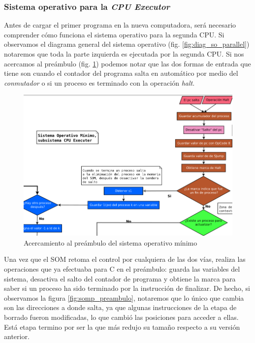 \documentclass[letterpaper,12pt,oneside]{book}
\begin{document}
			
			
			\subsubsection{Sistema operativo para la \textit{CPU Executor}}
			
				Antes de cargar el primer programa en la nueva computadora, será necesario comprender cómo funciona el sistema operativo para la
				segunda CPU. Si observamos el diagrama general 
				del sistema operativo (fig. \ref{fig:diag_so_parallel}) notaremos que toda la parte izquierda
				es ejecutada por la segunda CPU. Si nos acercamos al preámbulo (fig. \ref{fig:diag_so_paralel_cpue}) podemos notar que las
				dos formas de entrada que tiene son cuando el contador del programa salta en automático por medio del \textit{conmutador} o si
				un proceso es terminado con la operación \textit{halt}. 

			
			
			\begin{figure}[h]		
				\centering
				\includegraphics[scale=0.5]{media/Paralela/diag_so_paralel_cpue.png}
				\caption{ Acercamiento al preámbulo del sistema operativo mínimo}
				\label{fig:diag_so_paralel_cpue}
			\end{figure}	
			

				Una vez que el SOM retoma el control por cualquiera de las dos vías, realiza las operaciones que ya efectuaba para C en el preámbulo: 
				guarda las variables del sistema, desactiva
				el salto del contador de programa y obtiene la marca para saber si un proceso ha sido terminado por la instrucción de finalizar.
				 De hecho,
				si observamos la figura \ref{fig:somp_preambulo}, notaremos que lo único que cambia son las direcciones a donde salta,
				ya que algunas instrucciones de la etapa de borrado fueron modificadas, lo que cambió las posiciones para acceder a ellas. 
				Está etapa
				termino por ser la que más redujo su tamaño
				respecto a su versión anterior.
			
\end{document}
